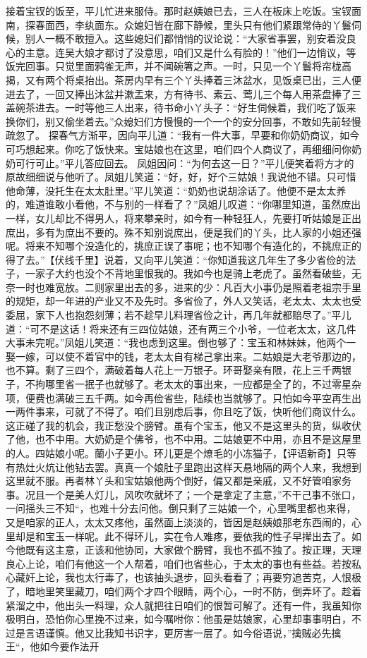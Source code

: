 \documentclass[12pt,oneside]{book}
\begin{document}
接着宝钗的饭至，平儿忙进来服侍。那时赵姨娘已去，三人在板床上吃饭。宝钗面南，探春面西，李纨面东。众媳妇皆在廊下静候，里头只有他们紧跟常侍的丫鬟伺候，别人一概不敢擅入。这些媳妇们都悄悄的议论说：“大家省事罢，别安着没良心的主意。连吴大娘才都讨了没意思，咱们又是什么有脸的！”他们一边悄议，等饭完回事。只觉里面鸦雀无声，并不闻碗箸之声。一时，只见一个丫鬟将帘栊高揭，又有两个将桌抬出。茶房内早有三个丫头捧着三沐盆水，见饭桌已出，三人便进去了，一回又捧出沐盆并漱盂来，方有待书、素云、莺儿三个每人用茶盘捧了三盖碗茶进去。一时等他三人出来，待书命小丫头子：“好生伺候着，我们吃了饭来换你们，别又偷坐着去。”众媳妇们方慢慢的一个一个的安分回事，不敢如先前轻慢疏忽了。
探春气方渐平，因向平儿道：“我有一件大事，早要和你奶奶商议，如今可巧想起来。你吃了饭快来。宝姑娘也在这里，咱们四个人商议了，再细细问你奶奶可行可止。”平儿答应回去。
凤姐因问：“为何去这一日？”平儿便笑着将方才的原故细细说与他听了。凤姐儿笑道：“好，好，好个三姑娘！我说他不错。只可惜他命薄，没托生在太太肚里。”平儿笑道：“奶奶也说胡涂话了。他便不是太太养的，难道谁敢小看他，不与别的一样看了？”凤姐儿叹道：“你哪里知道，虽然庶出一样，女儿却比不得男人，将来攀亲时，如今有一种轻狂人，先要打听姑娘是正出庶出，多有为庶出不要的。殊不知别说庶出，便是我们的丫头，比人家的小姐还强呢。将来不知哪个没造化的，挑庶正误了事呢；也不知哪个有造化的，不挑庶正的得了去。”【伏线千里】说着，又向平儿笑道：“你知道我这几年生了多少省俭的法子，一家子大约也没个不背地里恨我的。我如今也是骑上老虎了。虽然看破些，无奈一时也难宽放。二则家里出去的多，进来的少：凡百大小事仍是照着老祖宗手里的规矩，却一年进的产业又不及先时。多省俭了，外人又笑话，老太太、太太也受委屈，家下人也抱怨刻薄；若不趁早儿料理省俭之计，再几年就都赔尽了。”平儿道：“可不是这话！将来还有三四位姑娘，还有两三个小爷，一位老太太，这几件大事未完呢。”凤姐儿笑道：“我也虑到这里。倒也够了：宝玉和林妹妹，他两个一娶一嫁，可以使不着官中的钱，老太太自有梯己拿出来。二姑娘是大老爷那边的，也不算。剩了三四个，满破着每人花上一万银子。环哥娶亲有限，花上三千两银子，不拘哪里省一抿子也就够了。老太太的事出来，一应都是全了的，不过零星杂项，便费也满破三五千两。如今再俭省些，陆续也当就够了。只怕如今平空再生出一两件事来，可就了不得了。咱们且别虑后事，你且吃了饭，快听他们商议什么。这正碰了我的机会，我正愁没个膀臂。虽有个宝玉，他又不是这里头的货，纵收伏了他，也不中用。大奶奶是个佛爷，也不中用。二姑娘更不中用，亦且不是这屋里的人。四姑娘小呢。蘭小子更小。环儿更是个燎毛的小冻猫子，【评语新奇】只等有热灶火炕让他钻去罢。真真一个娘肚子里跑出这样天悬地隔的两个人来，我想到这里就不服。再者林丫头和宝姑娘他两个倒好，偏又都是亲戚，又不好管咱家务事。况且一个是美人灯儿，风吹吹就坏了；一个是拿定了主意，”不干己事不张口，一问摇头三不知“，也难十分去问他。倒只剩了三姑娘一个，心里嘴里都也来得，又是咱家的正人，太太又疼他，虽然面上淡淡的，皆因是赵姨娘那老东西闹的，心里却是和宝玉一样呢。此不得环儿，实在令人难疼，要依我的性子早撵出去了。如今他既有这主意，正该和他协同，大家做个膀臂，我也不孤不独了。按正理，天理良心上论，咱们有他这一个人帮着，咱们也省些心，于太太的事也有些益。若按私心藏奸上论，我也太行毒了，也该抽头退步，回头看看了；再要穷追苦克，人恨极了，暗地里笑里藏刀，咱们两个才四个眼睛，两个心，一时不防，倒弄坏了。趁着紧溜之中，他出头一料理，众人就把往日咱们的恨暂可解了。还有一件，我虽知你极明白，恐怕你心里挽不过来，如今嘱咐你：他虽是姑娘家，心里却事事明白，不过是言语谨慎。他又比我知书识字，更厉害一层了。如今俗语说，”擒贼必先擒王“，他如今要作法开
\end{document}
